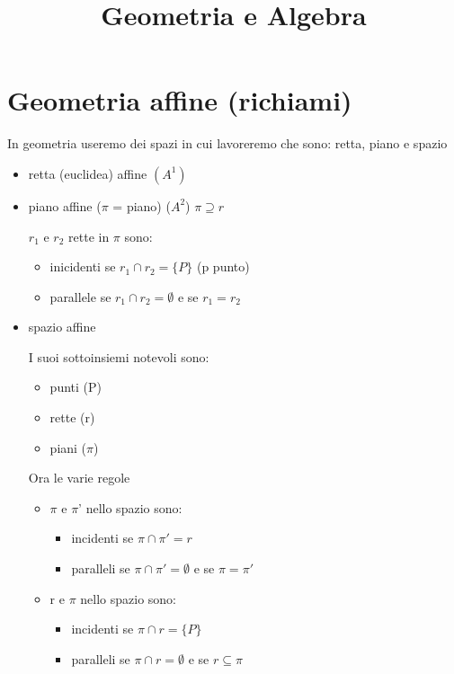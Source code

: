 \documentclass{article}
\title{Geometria e Algebra}
\begin{document}
\section{Geometria affine (richiami)}
\begin{flushleft}
	In geometria useremo dei spazi in cui lavoreremo che sono: retta, piano e spazio
\end{flushleft}
\begin{itemize}
	\item retta (euclidea) affine $(A^1)$
	\item piano affine ($\pi$ = piano) ($A^2$) $\pi \supseteq r$
	      \begin{flushleft}
		      $r_1$ e $r_2$ rette in $\pi$ sono:
	      \end{flushleft}
	      \begin{itemize}
		      \item inicidenti se $r_1 \cap r_2=\{ P \}$ (p punto)
		      \item parallele se $r_1 \cap r_2=\emptyset$ e se $ r_1 =r_2$
	      \end{itemize}
	\item spazio affine
	      \begin{flushleft}
		      I suoi sottoinsiemi notevoli sono:
	      \end{flushleft}
	      \begin{itemize}
		      \item punti (P)
		      \item rette (r)
		      \item piani ($\pi$)
	      \end{itemize}
	      \begin{flushleft}
		      Ora le varie regole
	      \end{flushleft}
	      \begin{itemize}
		      \item $\pi$ e $\pi$' nello spazio sono:
		            \begin{itemize}
			            \item incidenti se $\pi \cap \pi ' =r$
			            \item paralleli se $\pi \cap \pi ' =\emptyset$ e se $\pi = \pi '$
		            \end{itemize}
		      \item r e $\pi$ nello spazio sono:
		            \begin{itemize}
			            \item incidenti se $\pi \cap r = \{ P \}$
			            \item paralleli se $\pi \cap r = \emptyset$ e se $r \subseteq \pi$

\end{itemize}
\end{itemize}
\end{itemize}
\end{document}
